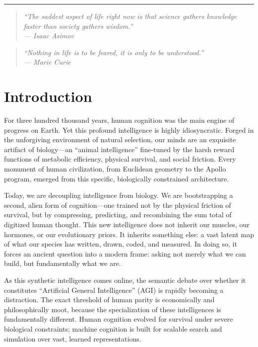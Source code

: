 \documentclass[12pt, letter]{article}
\begin{document}
\noindent\rule{\textwidth}{0.4pt}

\vspace{0.1cm}

\begin{quote}
\itshape ``The saddest aspect of life right now is that science gathers knowledge faster than society gathers wisdom.'' \\
\normalfont\hfill --- Isaac Asimov
\end{quote}

\vspace{0.1cm}

\begin{quote}
\itshape ``Nothing in life is to be feared, it is only to be understood.'' \\
\normalfont\hfill --- Marie Curie
\end{quote}


\clearpage

\tableofcontents
\clearpage


\section{Introduction}\label{sec:introduction}

For three hundred thousand years, human cognition was the main engine of progress on Earth. Yet this profound intelligence is highly idiosyncratic. Forged in the unforgiving environment of natural selection, our minds are an exquisite artifact of biology—an ``animal intelligence'' fine-tuned by the harsh reward functions of metabolic efficiency, physical survival, and social friction. Every monument of human civilization, from Euclidean geometry to the Apollo program, emerged from this specific, biologically constrained architecture.

Today, we are decoupling intelligence from biology. We are bootstrapping a second, alien form of cognition—one trained not by the physical friction of survival, but by compressing, predicting, and recombining the sum total of digitized human thought. This new intelligence does not inherit our muscles, our hormones, or our evolutionary priors. It inherits something else: a vast latent map of what our species has written, drawn, coded, and measured. In doing so, it forces an ancient question into a modern frame: asking not merely what we can build, but fundamentally what we are.

As this synthetic intelligence comes online, the semantic debate over whether it constitutes ``Artificial General Intelligence'' (AGI) is rapidly becoming a distraction. The exact threshold of human parity is economically and philosophically moot, because the specialization of these intelligences is fundamentally different. Human cognition evolved for survival under severe biological constraints; machine cognition is built for scalable search and simulation over vast, learned representations.
\end{document}
